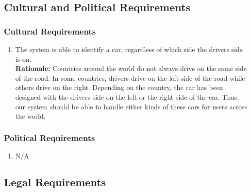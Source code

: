 \documentclass[]{article}
\begin{document}

\subsection{Cultural and Political Requirements}
\label{sub:cultural_and_political_requirements}

\subsubsection{Cultural Requirements}
\label{ssub:cultural_requirements}
\begin{enumerate}[label={CP-C\arabic*.}]
    \item The system is able to identify a car, regardless of which side the drivers side is on.\\
    \textbf{Rationale:} Countries around the world do not always drive on the same side of the road. In some countries, drivers drive on the left side of the road while others drive on the right. Depending on the country, the car has been designed with the drivers side on the left or the right side of the car. Thus, our system should be able to handle either kinds of these cars for users across the world.	
\end{enumerate}

\subsubsection{Political Requirements}
\label{ssub:political_requirements}
\begin{enumerate}[label={CP-P\arabic*.}]
    \item N/A
\end{enumerate}


\subsection{Legal Requirements}
\label{sub:legal_requirements}
\end{document}
